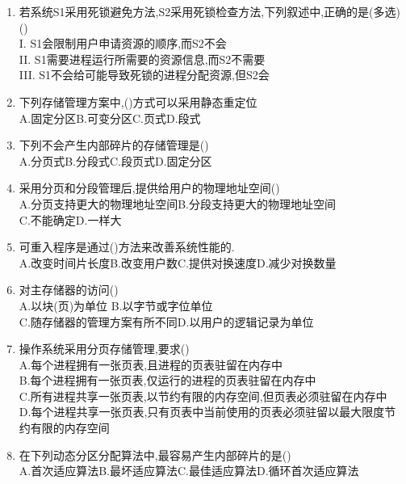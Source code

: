 \documentclass[12pt, a4paper, oneside, UTF8]{ctexbook}
\begin{document}
\begin{enumerate}
    \item 若系统S1采用死锁避免方法,S2采用死锁检查方法,下列叙述中,正确的是(多选)() \\
    I. S1会限制用户申请资源的顺序,而S2不会 \\
    II. S1需要进程运行所需要的资源信息,而S2不需要 \\
    III. S1不会给可能导致死锁的进程分配资源,但S2会

    \item 下列存储管理方案中,()方式可以采用静态重定位 \\
    A.固定分区\qquad B.可变分区\qquad C.页式\qquad D.段式

    \item 下列不会产生内部碎片的存储管理是() \\
    A.分页式\qquad B.分段式\qquad C.段页式\qquad D.固定分区

    \item 采用分页和分段管理后,提供给用户的物理地址空间() \\
    A.分页支持更大的物理地址空间\qquad B.分段支持更大的物理地址空间 \\
    C.不能确定\qquad D.一样大

    \item 可重入程序是通过()方法来改善系统性能的. \\
    A.改变时间片长度\qquad B.改变用户数\qquad C.提供对换速度\qquad D.减少对换数量 

    \item 对主存储器的访问() \\
    A.以块(页)为单位 \qquad B.以字节或字位单位 \\
    C.随存储器的管理方案有所不同\qquad D.以用户的逻辑记录为单位

    \item 操作系统采用分页存储管理,要求() \\
    A.每个进程拥有一张页表,且进程的页表驻留在内存中 \\
    B.每个进程拥有一张页表,仅运行的进程的页表驻留在内存中\\
    C.所有进程共享一张页表,以节约有限的内存空间,但页表必须驻留在内存中 \\
    D.每个进程共享一张页表,只有页表中当前使用的页表必须驻留以最大限度节约有限的内存空间

    \item 在下列动态分区分配算法中,最容易产生内部碎片的是()  \\
    A.首次适应算法\qquad B.最坏适应算法\qquad C.最佳适应算法\qquad D.循环首次适应算法


\end{enumerate}
\end{document}
